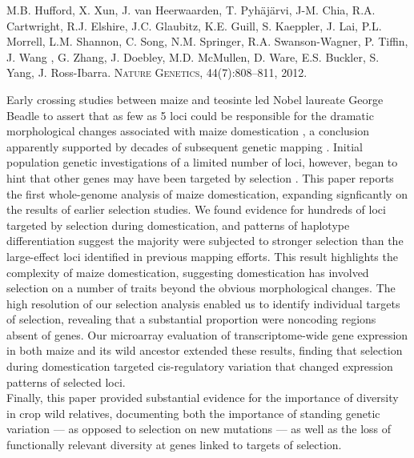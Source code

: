 \documentclass[11pt,letterpaper]{article}
\begin{document}
\large{ 
M.B. Hufford, X. Xun, J. van Heerwaarden, T. Pyh\"aj\"arvi, J-M. Chia, R.A. Cartwright, R.J. Elshire, J.C. Glaubitz, K.E. Guill, S. Kaeppler, J. Lai, P.L. Morrell, L.M. Shannon, C. Song, N.M. Springer, R.A. Swanson-Wagner, P. Tiffin, J. Wang , G. Zhang, J. Doebley, M.D. McMullen, D. Ware, E.S. Buckler, S. Yang, J. Ross-Ibarra. 
\textsc{Nature Genetics}, 44(7):808–811, 2012.}

\vspace{1cm}

\noindent Early crossing studies between maize and teosinte led Nobel laureate George Beadle to assert that as few as 5 loci could be responsible for the dramatic morphological changes associated with maize domestication \citep{beadle1972mystery}, a conclusion apparently supported by decades of subsequent genetic mapping \citep{briggs2007linkage}.
Initial population genetic investigations of a limited number of loci, however, began to hint that other genes may have been targeted by selection \citep{tenaillon2004selection, Wright2005}.
This paper reports the first whole-genome analysis of maize domestication, expanding signficantly on the results of earlier selection studies. 
We found evidence for hundreds of loci targeted by selection during domestication, and patterns of haplotype differentiation suggest the majority were subjected to stronger selection than the large-effect loci identified in previous mapping efforts.
This result highlights the complexity of maize domestication, suggesting domestication has involved selection on a number of traits beyond the obvious morphological changes.
The high resolution of our selection analysis enabled us to identify individual targets of selection, revealing that a substantial proportion were noncoding regions absent of genes.
Our microarray evaluation of transcriptome-wide gene expression in both maize and its wild ancestor extended these results, finding that selection during domestication targeted cis-regulatory variation that changed expression patterns of selected loci.\\

\noindent Finally, this paper provided substantial evidence for the importance of diversity in crop wild relatives, documenting both the importance of standing genetic variation --- as opposed to selection on new mutations --- as well as the loss of functionally relevant diversity at genes linked to targets of selection.\\
\end{document}
